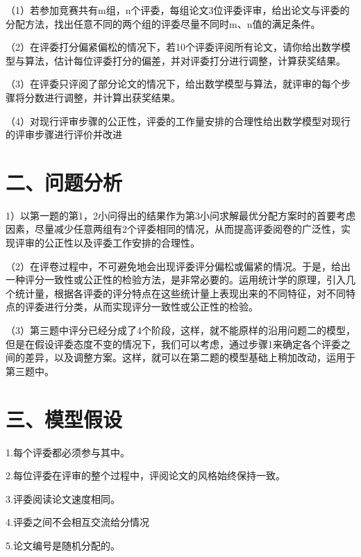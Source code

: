 \documentclass{my_paper}
\begin{document}
	（1）若参加竞赛共有m组，n个评委，每组论文3位评委评审，给出论文与评委的分配方法，找出任意不同的两个组的评委尽量不同时m、n值的满足条件。
	
	（2）在评委打分偏紧偏松的情况下，若10个评委评阅所有论文，请你给出数学模型与算法，估计每位评委打分的偏差，并对评委打分进行调整，计算获奖结果。
	
	（3）在评委只评阅了部分论文的情况下，给出数学模型与算法，就评审的每个步骤将分数进行调整，并计算出获奖结果。
	
	（4）对现行评审步骤的公正性，评委的工作量安排的合理性给出数学模型对现行的评审步骤进行评价并改进
	
	\section{二、问题分析}
	1）以第一题的第1，2小问得出的结果作为第3小问求解最优分配方案时的首要考虑因素，尽量减少任意两组有2个评委相同的情况，从而提高评委阅卷的广泛性，实现评审的公正性以及评委工作安排的合理性。
	
	（2）在评卷过程中，不可避免地会出现评委评分偏松或偏紧的情况。于是，给出一种评分一致性或公正性的检验方法，是非常必要的。运用统计学的原理，引入几个统计量，根据各评委的评分特点在这些统计量上表现出来的不同特征，对不同特点的评委进行分类，从而实现评分一致性或公正性的检验。
	
	（3）第三题中评分已经分成了4个阶段，这样，就不能原样的沿用问题二的模型，但是在假设评委态度不变的情况下，我们可以考虑，通过步骤1来确定各个评委之间的差异，以及调整方案。这样，就可以在第二题的模型基础上稍加改动，运用于第三题中。
	\section{三、模型假设}
	1.每个评委都必须参与其中。
	
	2.每位评委在评审的整个过程中，评阅论文的风格始终保持一致。
	
	3.评委阅读论文速度相同。
	
	4.评委之间不会相互交流给分情况
	
	5.论文编号是随机分配的。
	
	
	\newpage
\end{document}
